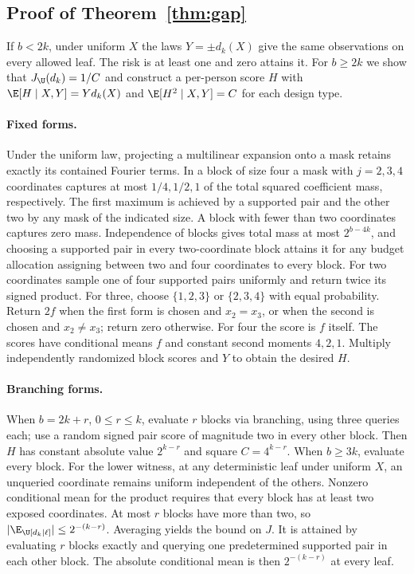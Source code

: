 \subsection{Proof of Theorem~\ref{thm:gap}}\label{app:gap}
If $b<2k$, under uniform $X$ the laws $Y=\pm d_k(X)$ give the same observations on every allowed leaf. The risk is at least one and zero attains it. For $b\ge2k$ we show that $J_\U(d_k)=1/C$ and construct a per-person score $H$ with $\E[H\mid X,Y]=Yd_k(X)$ and $\E[H^2\mid X,Y]=C$ for each design type.

\paragraph{Fixed forms.}
Under the uniform law, projecting a multilinear expansion onto a mask retains exactly its contained Fourier terms. In a block of size four a mask with $j=2,3,4$ coordinates captures at most $1/4,1/2,1$ of the total squared coefficient mass, respectively. The first maximum is achieved by a supported pair and the other two by any mask of the indicated size. A block with fewer than two coordinates captures zero mass. Independence of blocks gives total mass at most $2^{b-4k}$, and choosing a supported pair in every two-coordinate block attains it for any budget allocation assigning between two and four coordinates to every block. For two coordinates sample one of four supported pairs uniformly and return twice its signed product. For three, choose $\{1,2,3\}$ or $\{2,3,4\}$ with equal probability. Return $2f$ when the first form is chosen and $x_2=x_3$, or when the second is chosen and $x_2\ne x_3$; return zero otherwise. For four the score is $f$ itself. The scores have conditional means $f$ and constant second moments $4,2,1$. Multiply independently randomized block scores and $Y$ to obtain the desired $H$.

\paragraph{Branching forms.}
When $b=2k+r$, $0\le r\le k$, evaluate $r$ blocks via branching, using three queries each; use a random signed pair score of magnitude two in every other block. Then $H$ has constant absolute value $2^{k-r}$ and square $C=4^{k-r}$. When $b\ge3k$, evaluate every block. For the lower witness, at any deterministic leaf under uniform $X$, an unqueried coordinate remains uniform independent of the others. Nonzero conditional mean for the product requires that every block has at least two exposed coordinates. At most $r$ blocks have more than two, so $|\E_\U[d_k\mid\ell]|\le2^{-(k-r)}$. Averaging yields the bound on $J$. It is attained by evaluating $r$ blocks exactly and querying one predetermined supported pair in each other block. The absolute conditional mean is then $2^{-(k-r)}$ at every leaf.

